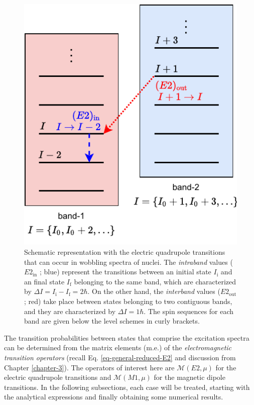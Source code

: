 \begin{figure}
    \centering
    \includegraphics[scale=1.1]{Chapters/Figures/transitions-wobbling-states.pdf}
    \caption{Schematic representation with the electric quadrupole transitions that can occur in wobbling spectra of nuclei. The \emph{intraband} values ($E2_\text{in}$ ; blue) represent the transitions between an initial state $I_\text{i}$ and an final state $I_\text{f}$ belonging to the same band, which are characterized by $\Delta I=I_\text{i}-I_\text{f}=2\hbar$. On the other hand, the \emph{interband} values ($E2_\text{out}$ ; red) take place between states belonging to two contiguous bands, and they are characterized by $\Delta I=1\hbar$. The spin sequences for each band are given below the level schemes in curly brackets.}
    \label{schematic-interband-intraband-E2}
\end{figure}

The transition probabilities between states that comprise the excitation spectra can be determined from the matrix elements (m.e.) of the \emph{electromagnetic transition operators} (recall Eq. \ref{eq-general-reduced-E2} and discussion from Chapter \ref{chapter-3}). The operators of interest here are $\mathcal{M}(E2,\mu)$ for the electric quadrupole transitions and $\mathcal{M}(M1,\mu)$ for the magnetic dipole transitions. In the following subsections, each case will be treated, starting with the analytical expressions and finally obtaining some numerical results.

